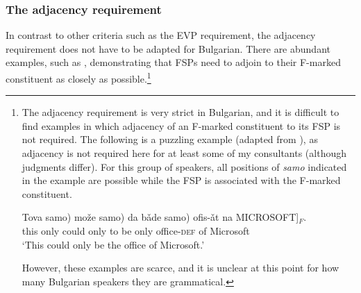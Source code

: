 \documentclass[output=paper,colorlinks,citecolor=brown]{langscibook}
\begin{document}
\subsubsection{The adjacency requirement}\label{sec:3.3.4}
In contrast to other criteria such as the EVP requirement, the adjacency requirement does not have to be adapted for Bulgarian. There are abundant examples, such as , demonstrating that FSPs need to adjoin to their F-marked constituent as closely as possible.\footnote{The adjacency requirement is very strict in Bulgarian, and it is difficult to find examples in which adjacency of an F-marked constituent to its FSP is not required. The following is a puzzling example (adapted from \citealt{TishevaDzhonova2003}), as adjacency is not required here for at least some of my consultants (although judgments differ). For this group of speakers, all positions of \textit{samo} indicated in the example are possible while the FSP is associated with the F-marked constituent.

\ea 
{\gll Tova \minsp{(} samo) mo\v{z}e \minsp{(} samo) da b\v{a}de \minsp{(} samo) \minsp{[} ofis-\v{a}t na MICROSOFT]$_{F}$. \\
this {} only could {} only to be {} only {} office-\textsc{def} of Microsoft  \\ 
\glt `This could only be the office of Microsoft.'}
\z  

\noindent However, these examples are scarce, and it is unclear at this point for how many Bulgarian speakers they are grammatical.
} 

\label{adjacency}
\z 
\end{document}
